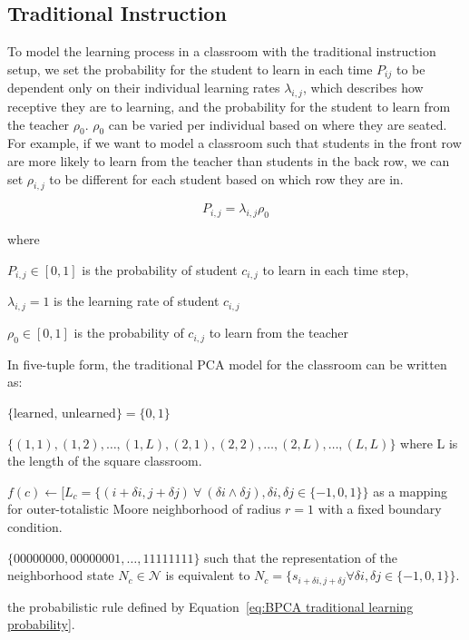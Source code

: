 \subsection{Traditional Instruction}
To model the learning process in a classroom with the traditional instruction setup, we set the probability for the student to learn in each time $P_{ij}$ to be dependent only on their individual learning rates $\lambda_{i,j}$, which describes how receptive they are to learning, and the probability for the student to learn from the teacher $\rho_0$.
$\rho_0$ can be varied per individual based on where they are seated. 
For example, if we want to model a classroom such that students in the front row are more likely to learn from the teacher than students in the back row, we can set $\rho_{i,j}$ to be different for each student based on which row they are in.

\begin{equation}
    \label{eq:BPCA traditional learning probability}
        P_{i,j} = \lambda_{i,j} \rho_{0}
\end{equation}

where

$P_{i,j} \in [0,1]$ is the probability of student $c_{i,j}$ to learn in each time step, 

$\lambda_{i,j} = 1$ is the learning rate of student $c_{i,j}$

$\rho_{0} \in [0,1]$ is the probability of $c_{i,j}$ to learn from the teacher

In five-tuple form, the traditional PCA model for the classroom can be written as:

\begin{CAdef}
\itemS $\lbrace \text{learned, unlearned} \rbrace = \lbrace 0, 1 \rbrace$

\itemC $\lbrace (1,1), (1,2), \dots, (1,L), (2, 1), (2,2), \dots, (2,L), \dots, (L,L)\rbrace$ where L is the length of the square classroom.

\itemL $f(c) \leftarrow \lbrack L_c = \lbrace (i+\delta i,j+\delta j) ~\forall~ (\delta i \land \delta j),  \delta i, \delta j \in \lbrace -1,0,1 \rbrace \rbrace $ as a mapping for outer-totalistic Moore neighborhood of radius $r=1$ with a fixed boundary condition.

\itemN $\lbrace 00000000, 00000001, \dots, 11111111 \rbrace$ such that the representation of the neighborhood state $N_c \in \mathcal{N}$ is equivalent to $N_c = \lbrace s_{i+\delta i, j+\delta j} \forall \delta i, \delta j \in \lbrace -1,0,1 \rbrace \rbrace$.

\itemR the probabilistic rule defined by Equation~\ref{eq:BPCA traditional learning probability}.
\end{CAdef}

